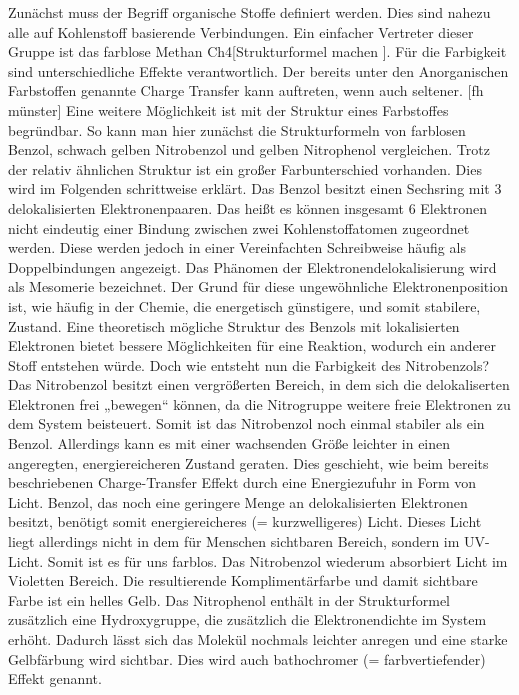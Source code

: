 \documentclass[11pt]{scrreprt}
\begin{document}
Zunächst muss der Begriff organische Stoffe definiert werden. Dies sind nahezu alle auf Kohlenstoff basierende Verbindungen. Ein einfacher Vertreter dieser Gruppe ist das farblose Methan Ch4[Strukturformel machen	].
Für die Farbigkeit sind unterschiedliche Effekte verantwortlich. Der bereits unter den Anorganischen Farbstoffen genannte Charge Transfer kann auftreten, wenn auch seltener. [fh münster]
Eine weitere Möglichkeit ist mit der Struktur eines Farbstoffes begründbar. 
So kann man hier zunächst die Strukturformeln von farblosen Benzol, schwach gelben Nitrobenzol und gelben Nitrophenol vergleichen. Trotz der relativ ähnlichen Struktur ist ein großer Farbunterschied vorhanden. 
Dies wird im Folgenden schrittweise erklärt. Das Benzol besitzt einen Sechsring mit 3 delokalisierten Elektronenpaaren. Das heißt es können insgesamt 6 Elektronen nicht eindeutig einer Bindung zwischen zwei Kohlenstoffatomen zugeordnet werden. Diese werden jedoch in einer Vereinfachten Schreibweise häufig als Doppelbindungen angezeigt. Das Phänomen der Elektronendelokalisierung wird als Mesomerie bezeichnet. Der Grund für diese ungewöhnliche Elektronenposition ist, wie häufig in der Chemie, die energetisch günstigere, und somit stabilere, Zustand. Eine theoretisch mögliche Struktur des Benzols mit lokalisierten Elektronen bietet bessere Möglichkeiten für eine Reaktion, wodurch ein anderer Stoff entstehen würde.
Doch wie entsteht nun die Farbigkeit des Nitrobenzols? 
Das Nitrobenzol besitzt einen vergrößerten Bereich, in dem sich die delokaliserten Elektronen frei „bewegen“ können, da die Nitrogruppe weitere freie Elektronen zu dem System beisteuert. Somit ist das Nitrobenzol noch einmal stabiler als ein Benzol. Allerdings kann es mit einer wachsenden Größe leichter in einen angeregten, energiereicheren Zustand geraten. Dies geschieht, wie beim bereits beschriebenen Charge-Transfer Effekt durch eine Energiezufuhr in Form von Licht. Benzol, das noch eine geringere Menge an delokalisierten Elektronen besitzt, benötigt somit energiereicheres (= kurzwelligeres) Licht. Dieses Licht liegt allerdings nicht in dem für Menschen sichtbaren Bereich, sondern im UV-Licht. Somit ist es für uns farblos. Das Nitrobenzol wiederum absorbiert Licht im Violetten Bereich. Die resultierende Komplimentärfarbe und damit sichtbare Farbe ist ein helles Gelb. 
Das Nitrophenol enthält in der Strukturformel zusätzlich eine Hydroxygruppe, die zusätzlich die Elektronendichte im System erhöht. Dadurch lässt sich das Molekül nochmals leichter anregen und eine starke Gelbfärbung wird sichtbar. Dies wird auch bathochromer (= farbvertiefender) Effekt genannt.
\end{document}
